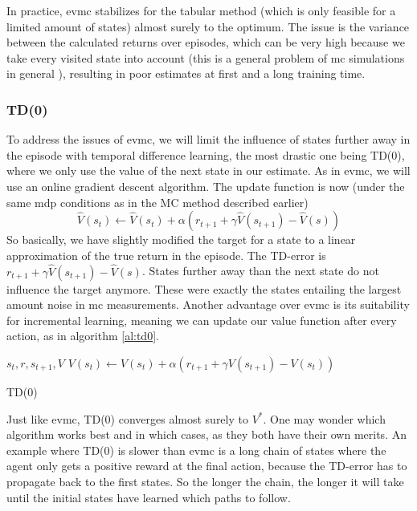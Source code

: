 In practice, \gls{evmc} stabilizes for the tabular method (which is only feasible for a limited amount of states) almost surely to the optimum. The issue is the variance between the calculated returns over episodes, which can be very high because we take every visited state into account (this is a general problem of \gls{mc} simulations in general \cite{robert05}), resulting in poor estimates at first and a long training time. \\

\subsubsection*{TD(0)}
To address the issues of \gls{evmc}, we will limit the influence of states further away in the episode with temporal difference learning, the most drastic one being TD(0), where we only use the value of the next state in our estimate. As in \gls{evmc}, we will use an online gradient descent algorithm. The update function is now (under the same \gls{mdp} conditions as in the MC method described earlier)
\begin{equation}
\hat{V}(s_t) \leftarrow \hat{V}(s_t)+\alpha\left(r_{t+1}+\gamma\hat{V}(s_{t+1}) -\hat{V}(s)\right)
\end{equation}
So basically, we have slightly modified the target for a state to a linear approximation of the true return in the episode. The TD-error is $r_{t+1}+\gamma\hat{V}(s_{t+1}) -\hat{V}(s)$. States further away than the next state do not influence the target anymore. These were exactly the states entailing the largest amount noise in \gls{mc} measurements. Another advantage over \gls{evmc} is its suitability for incremental learning, meaning we can update our value function after every action, as in algorithm \ref{al:td0}.

\begin{algorithm}
\begin{algorithmic}
\REQUIRE $s_t,r,s_{t+1},V$
\STATE $V(s_t) \leftarrow V(s_t)+\alpha\left(r_{t+1}+\gamma V(s_{t+1}) -V(s_t)\right)$
\end{algorithmic}
\caption{TD(0)}
\label{al:td0}
\end{algorithm}

Just like \gls{evmc}, TD(0) converges almost surely to $V^*$. One may wonder which algorithm works best and in which cases, as they both have their own merits. An example where TD(0) is slower than \gls{evmc} is a long chain of states where the agent only gets a positive reward at the final action, because the TD-error has to propagate back to the first states. So the longer the chain, the longer it will take until the initial states have learned which paths to follow.

